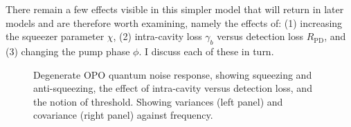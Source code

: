 There remain a few effects visible in this simpler model that will return in later models and are therefore worth examining, namely the effects of: (1) increasing the squeezer parameter $\chi$, (2) intra-cavity loss $\gamma_b$ versus detection loss $R_\text{PD}$, and (3) changing the pump phase $\phi$. I discuss each of these in turn. %

\begin{figure}
	\centering
	\caption{Degenerate OPO quantum noise response, showing squeezing and anti-squeezing, the effect of intra-cavity versus detection loss, and the notion of threshold. Showing variances (left panel) and covariance (right panel) against frequency.}
	\label{fig:dOPO_variances}
\end{figure}


